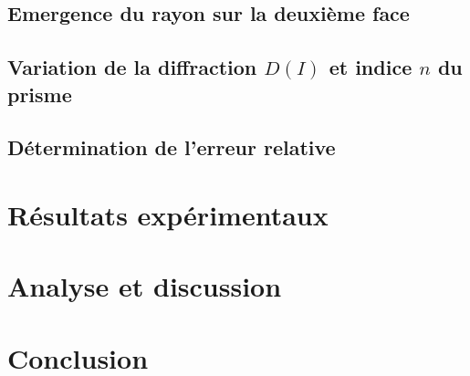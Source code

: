 \documentclass[a4paper,12pt]{article}
\begin{document}
\subsection{Emergence du rayon sur la deuxième face}


\subsection{Variation de la diffraction \texorpdfstring{$D(I)$}{D(I)} et indice \texorpdfstring{$n$}{n} du prisme}


\subsection{Détermination de l'erreur relative}


\section{Résultats expérimentaux}


\section{Analyse et discussion}


\section*{Conclusion}

\end{document}
